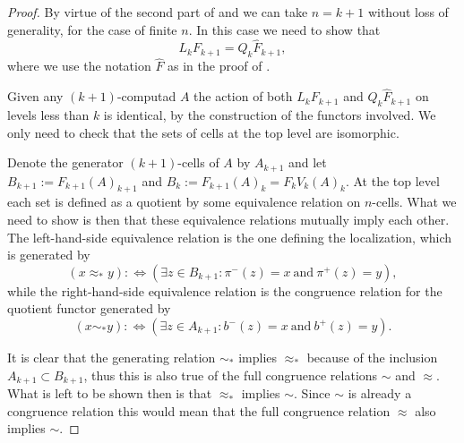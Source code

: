 \documentclass[12pt,a4paper]{article}
\numberwithin{equation}{section}
\begin{document}
\begin{proof}
    By virtue of the second part of  and  we can take $n=k+1$ without loss of generality, for the case of finite $n$. In this case we need to show that
    \begin{equation}
        L_k F_{k+1} = Q_k \hat{F}_{k+1},
    \end{equation}
    where we use the notation $\hat{F}$ as in the proof of .

    Given any $(k+1)$-computad $A$ the action of both $L_k F_{k+1}$ and $Q_k \hat{F}_{k+1}$ on levels less than $k$ is identical, by the construction of the functors involved. We only need to check that the sets of cells at the top level are isomorphic. 
    
    Denote the generator $(k+1)$-cells of $A$ by $A_{k+1}$ and let $B_{k+1} := F_{k+1}(A)_{k+1}$ and $B_k := F_{k+1} (A)_{k} = F_k V_k (A)_k$. At the top level each set is defined as a quotient by some equivalence relation on $n$-cells. What we need to show is then that these equivalence relations mutually imply each other. The left-hand-side equivalence relation is the one defining the localization, which is generated by 
    \begin{equation}
        (x \approx_* y) :\Leftrightarrow \left( \exists z \in B_{k+1}: \pi^-(z) = x \ \mathrm{and} \ \pi^+(z) = y \right),
    \end{equation}
    while the right-hand-side equivalence relation is the congruence relation for the quotient functor generated by
    \begin{equation}
        (x \sim_* y) :\Leftrightarrow \left( \exists z \in A_{k+1}: b^-(z) = x \ \mathrm{and} \ b^+(z) = y \right).
    \end{equation}
    
    It is clear that the generating relation $\sim_*$ implies $\approx_*$ because of the inclusion $A_{k+1} \subset B_{k+1}$, thus this is also true of the full congruence relations $\sim$ and $\approx$. What is left to be shown then is that $\approx_*$ implies $\sim$. Since $\sim$ is already a congruence relation this would mean that the full congruence relation $\approx$ also implies $\sim$.
    

\end{proof}
\end{document}
